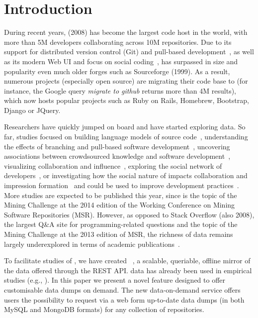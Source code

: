 
\section{Introduction}
\label{sec:intro}

During recent years, \gh (2008) has become the largest code host in the world, with more than 5M developers
collaborating across 10M repositories.
Due to its support for distributed version control (Git) and pull-based development~\cite{barr2012cohesive}, 
as well as its modern Web UI and focus on social coding~\cite{dabbish2012social}, \gh has surpassed in size
and popularity even much older forges such as Sourceforge (1999).
As a result, numerous projects (especially open source) are migrating their code base to \gh (for instance, 
the Google query \emph{migrate to github} returns more than 4M results), which now hosts popular projects
such as Ruby on Rails, Homebrew, Bootstrap, Django or JQuery.

Researchers have quickly jumped on board and have started exploring \gh data.
So far, studies focused on 
building language models of source code~\cite{allamanis2013mining}, 
understanding the effects of branching and pull-based software development~\cite{lee2013git, gousios2014exploratory}, 
uncovering associations between crowdsourced knowledge and software development~\cite{vasilescu2013stackoverflow},
visualizing collaboration and influence~\cite{heller2011visualizing}, 
exploring the social network of developers~\cite{thung2013network, schall2013follow, jiang2013understanding},
or investigating how the social nature of \gh impacts collaboration and impression formation~\cite{dabbish2012social, marlow2013impression}
and could be used to improve development practices~\cite{pham2013creating, pham2013building}.
More studies are expected to be published this year, since \gh is the topic of the Mining Challenge
at the 2014 edition of the Working Conference on Mining Software Repositories (MSR).
However, as opposed to Stack Overflow (also 2008), the largest Q\&A site for programming-related questions
and the topic of the Mining Challenge at the 2013 edition of MSR, the richness of \gh data remains
largely underexplored in terms of academic publications~\cite{vasilescu2012meta}.

To facilitate studies of \gh, we have created \ght~\cite{gousios2012ghtorrent, gousios2013ghtorent}, a scalable, 
queriable, offline mirror of the data offered through the \gh REST API.
\ght data has already been used in empirical studies (e.g., \cite{gousios2014exploratory, squire2014forge, 
vasilescu2013stackoverflow}).
In this paper we present a novel feature designed to offer customisable data dumps on demand.
The new \ght data-on-demand service offers users the possibility to request via a web form up-to-date \ght 
data dumps (in both MySQL and MongoDB formats) for any collection of \gh repositories.

